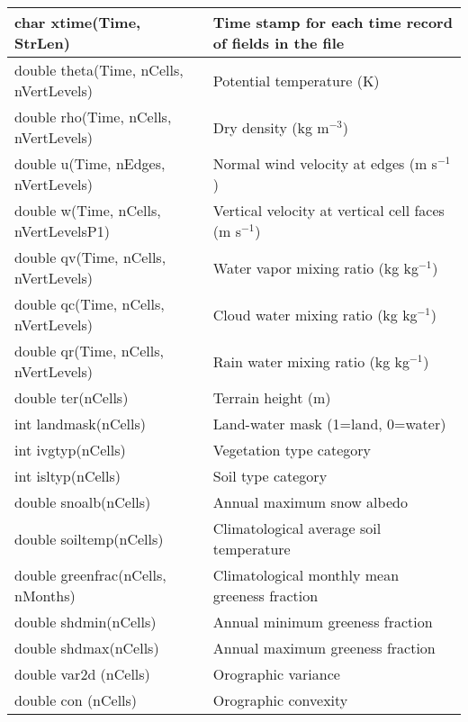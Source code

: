 {\small     
\begin{longtable}{|p{2.5in} |p{3.75in}|}
 \hline
        char xtime(Time, StrLen)     & Time stamp for each time record of fields in the file \\ \hline
        double \hfil\break theta(Time, nCells, nVertLevels)      &        Potential temperature (K) \\ \hline
        double rho(Time, nCells, nVertLevels)        &        Dry density (kg m$^{-3}$) \\ \hline
        double u(Time, nEdges, nVertLevels)         & Normal wind velocity at edges (m s$^{-1}$) \\ \hline
        double \hfil\break w(Time, nCells, nVertLevelsP1)       & Vertical velocity at vertical cell faces (m s$^{-1}$) \\ \hline
        double qv(Time, nCells, nVertLevels)   &              Water vapor mixing ratio (kg kg$^{-1}$) \\ \hline
        double qc(Time, nCells, nVertLevels)   &              Cloud water mixing ratio (kg kg$^{-1}$) \\ \hline
        double qr(Time, nCells, nVertLevels)   &              Rain water mixing ratio (kg kg$^{-1}$) \\ \hline
        double ter(nCells)           &  Terrain height (m) \\ \hline
        int landmask(nCells)         &  Land-water mask (1=land, 0=water) \\ \hline
        int ivgtyp(nCells)           &  Vegetation type category \\ \hline
        int isltyp(nCells)           &  Soil type category \\ \hline
        double snoalb(nCells)        &  Annual maximum snow albedo \\ \hline
        double soiltemp(nCells)      &  Climatological average soil temperature \\ \hline
        double greenfrac(nCells, nMonths)    & Climatological monthly mean greeness fraction \\ \hline
        double shdmin(nCells)                & Annual minimum greeness fraction \\ \hline
        double shdmax(nCells)                & Annual maximum greeness fraction \\ \hline
        double var2d (nCells) & Orographic variance \\ \hline
        double con (nCells) & Orographic convexity \\ \hline

\end{longtable}}
